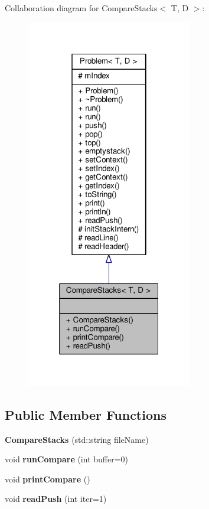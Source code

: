 Collaboration diagram for Compare\+Stacks$<$ T, D $>$\+:
\nopagebreak
\begin{figure}[H]
\begin{center}
\leavevmode
\includegraphics[width=205pt]{class_compare_stacks__coll__graph}
\end{center}
\end{figure}
\subsection*{Public Member Functions}
\begin{DoxyCompactItemize}
\item 
{\bfseries Compare\+Stacks} (std\+::string file\+Name)\hypertarget{class_compare_stacks_a0f3c2b21705805d2e80f528bbc3bcb3f}{}\label{class_compare_stacks_a0f3c2b21705805d2e80f528bbc3bcb3f}

\item 
void {\bfseries run\+Compare} (int buffer=0)\hypertarget{class_compare_stacks_ae90c5d2cc73db90fa62a918e939a2a9d}{}\label{class_compare_stacks_ae90c5d2cc73db90fa62a918e939a2a9d}

\item 
void {\bfseries print\+Compare} ()\hypertarget{class_compare_stacks_a9b1bcc007486170cc82167b6f609b37d}{}\label{class_compare_stacks_a9b1bcc007486170cc82167b6f609b37d}

\item 
void {\bfseries read\+Push} (int iter=1)\hypertarget{class_compare_stacks_ad4a4749ec1085d57d04165e1ec92efe5}{}\label{class_compare_stacks_ad4a4749ec1085d57d04165e1ec92efe5}

\end{DoxyCompactItemize}
